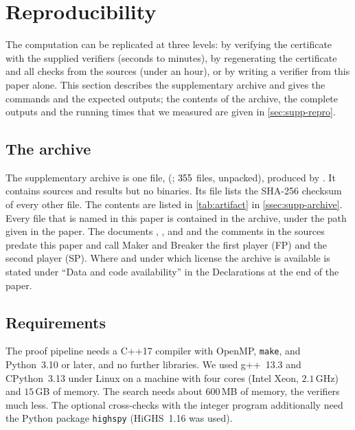 \section{Reproducibility}\label{sec:repro}


The computation can be replicated at three levels: by verifying the certificate with the supplied
verifiers (seconds to minutes), by regenerating the certificate and all checks from the sources (under an
hour), or by writing a verifier from this paper alone. This section describes the supplementary archive
and gives the commands and the expected outputs; the contents of the archive, the complete outputs and
the running times that we measured are given in \cref{sec:supp-repro}.

\subsection{The archive}\label{ssec:artifact}

The supplementary archive is one file,  (\ArchiveSize; $355$ files,
\ArchiveUnpacked{} unpacked), produced by
. It contains sources and results but no binaries. Its file
 lists the SHA-256 checksum of every other file. The contents are listed in
\cref{tab:artifact} in \cref{ssec:supp-archive}. Every file that is named in this paper is contained in
the archive, under the path given in the paper. The documents , ,  and  and the comments in the
sources predate this paper and call Maker and Breaker the first player (FP) and the second player (SP).
Where and under which license the archive is available is stated under ``Data and code availability'' in
the Declarations at the end of the paper.

\subsection{Requirements}\label{ssec:requirements}

The proof pipeline needs a C++17 compiler with OpenMP, \texttt{make}, and Python~3.10 or later, and no
further libraries. We used g++~13.3 and CPython~3.13 under Linux on a machine with four cores (Intel Xeon,
$2.1$\,GHz) and $15$\,GB of memory. The search needs about $600$\,MB of memory, the verifiers much less.
The optional cross-checks with the integer program additionally need the Python package \texttt{highspy}
(HiGHS~1.16 was used).


